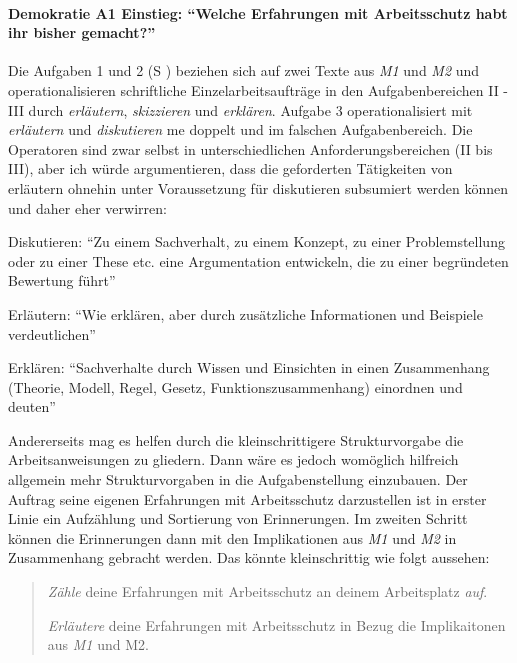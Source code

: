 \paragraph{Demokratie A1 Einstieg: \enquote{Welche Erfahrungen mit Arbeitsschutz habt ihr bisher gemacht?} \label{DemokratieA1}} 

Die Aufgaben 1 und 2 (\gls{S} \pageref{DEMOKRATIE-A1}) beziehen sich auf zwei Texte aus \emph{M1} und \emph{M2} und operationalisieren schriftliche Einzelarbeitsaufträge in den Aufgabenbereichen II - III durch \emph{erläutern}, \emph{skizzieren} und \emph{erklären}.
Aufgabe 3 operationalisiert mit \emph{erläutern} und \emph{diskutieren} \gls{me} doppelt und im falschen Aufgabenbereich. Die Operatoren sind zwar selbst in unterschiedlichen Anforderungsbereichen (II bis III), aber ich würde argumentieren, dass die geforderten Tätigkeiten von erläutern ohnehin unter Voraussetzung für diskutieren subsumiert werden können und daher eher verwirren:
\begin{myitemize}
    \item Diskutieren: \enquote{Zu einem Sachverhalt, zu einem Konzept, zu einer Problemstellung oder zu einer These etc. eine Argumentation entwickeln, die zu einer begründeten Bewertung führt} 
    \item Erläutern: \enquote{Wie erklären, aber durch zusätzliche Informationen und Beispiele verdeutlichen}
    \item Erklären: \enquote{Sachverhalte durch Wissen und Einsichten in einen Zusammenhang (Theorie, Modell, Regel, Gesetz, Funktionszusammenhang) einordnen und deuten} 

    \autocite[][13-14]{lower2008}
\end{myitemize}
Andererseits mag es helfen durch die kleinschrittigere Strukturvorgabe die Arbeitsanweisungen zu gliedern. Dann wäre es jedoch womöglich hilfreich allgemein mehr Strukturvorgaben in die Aufgabenstellung einzubauen. Der Auftrag seine eigenen Erfahrungen mit Arbeitsschutz darzustellen ist in erster Linie ein Aufzählung und Sortierung von Erinnerungen. Im zweiten Schritt können die Erinnerungen dann mit den Implikationen aus \emph{M1} und \emph{M2} in Zusammenhang gebracht werden. 
Das könnte kleinschrittig wie folgt aussehen:
\begin{quote}
    \emph{Zähle} deine Erfahrungen mit Arbeitsschutz an deinem Arbeitsplatz \emph{auf}.

    \emph{Erläutere} deine Erfahrungen mit Arbeitsschutz in Bezug die Implikaitonen aus \emph{M1} und M2. 
\end{quote}

